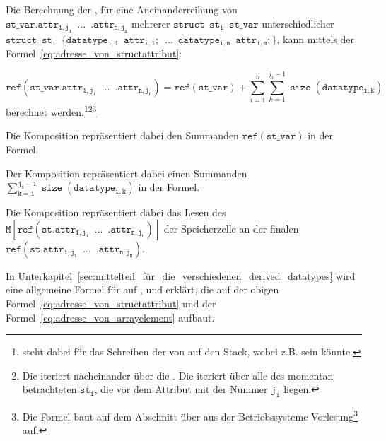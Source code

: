 \begin{Special_Paragraph}
  Die Berechnung der , für eine Aneinanderreihung von  $\mathtt{st\_var.attr_{1, j_1}\enspace\ldots\enspace .attr_{n, j_n}}$ mehrerer  $\mathtt{struct\enspace st_i\enspace st\_var}$ unterschiedlicher  $\mathtt{struct\enspace st_i\enspace \{datatype_{i, 1}\enspace attr_{i, 1};\enspace\ldots\enspace datatype_{i, m}\enspace attr_{i, m};\}}$, kann mittels der Formel~\ref{eq:adresse_von_structattribut}:

  \begin{equation}
    \mathtt{ref(st\_var.attr_{1, j_1}\enspace\ldots\enspace .attr_{n, j_n})} = \mathtt{ref(st\_var)} + \sum_{i=1}^{n}\sum_{k=1}^{j_i - 1} \mathtt{\operatorname{size}(datatype_{i, k})}
    \label{eq:adresse_von_structattribut}
  \end{equation}
  berechnet werden.\footnote{ steht dabei für das Schreiben der  von  auf den Stack, wobei  z.B.  sein könnte.}\footnote{Die  iteriert nacheinander über die . Die  iteriert über alle  des momentan betrachteten  $\mathtt{st_i}$, die vor dem Attribut mit der Nummer $\mathtt{j_i}$ liegen.}\footnote{Die Formel baut auf dem Abschnitt über  aus der Betriebssysteme Vorlesung\footcite{scholl_betriebssysteme_2020} auf.}

  Die Komposition  repräsentiert dabei den Summanden $\mathtt{ref(st\_var)}$ in der Formel.

  Der Komposition  repräsentiert dabei einen Summanden $\mathtt{\sum_{k=1}^{j_i - 1} \operatorname{size}(datatype_{i, k})}$ in der Formel.

  Die Komposition  repräsentiert dabei das Lesen des  $\mathtt{M\left[ref(st.attr_{1, j_1}\enspace\ldots\enspace .attr_{n, j_n})\right]}$ der Speicherzelle an der finalen   $\mathtt{ref(st.attr_{1, j_1}\enspace\ldots\enspace .attr_{n, j_n})}$.

  In Unterkapitel~\ref{sec:mittelteil_für_die_verschiedenen_derived_datatypes} wird eine allgemeine Formel für  auf ,  und  erklärt, die auf der obigen Formel~\ref{eq:adresse_von_structattribut} und der Formel~\ref{eq:adresse_von_arrayelement} aufbaut.
\end{Special_Paragraph}


